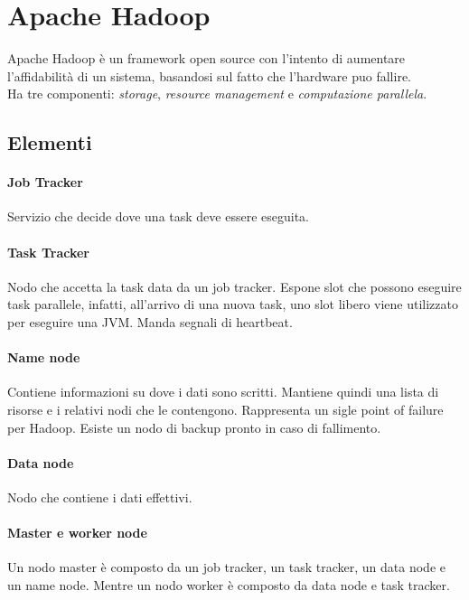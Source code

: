 \section{Apache Hadoop}
Apache Hadoop è un framework open source con l'intento di aumentare l'affidabilità di un sistema, basandosi sul fatto che l'hardware puo fallire.
\\Ha tre componenti: \emph{storage}, \emph{resource management} e \emph{computazione parallela}.

\subsection{Elementi}

\paragraph{Job Tracker}
Servizio che decide dove una task deve essere eseguita.

\paragraph{Task Tracker}
Nodo che accetta la task data da un job tracker. Espone slot che possono eseguire
task parallele, infatti, all'arrivo di una nuova task, uno slot libero viene utilizzato per eseguire una JVM. Manda segnali di heartbeat.

\paragraph{Name node}
Contiene informazioni su dove i dati sono scritti. Mantiene quindi una lista 
di risorse e i relativi nodi che le contengono. Rappresenta un sigle point of failure
per Hadoop. Esiste un nodo di backup pronto in caso di fallimento.

\paragraph{Data node}
Nodo che contiene i dati effettivi.

\paragraph{Master e worker node}
Un nodo master è composto da un job tracker, un task tracker, un data node e un name node. Mentre un nodo worker è composto da data node e task tracker.

